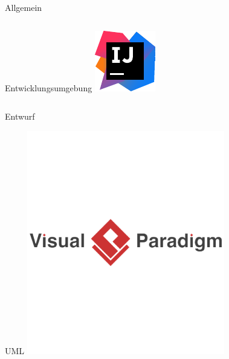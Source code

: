 \documentclass[xcolor=dvipsnames]{beamer}
\begin{document}
\begin{frame}{Allgemein}
\begin{columns}
\begin{column}{0.5\textwidth}
\begin{block}{Entwicklungsumgebung}
                    \includegraphics[width=\textwidth]{img/intellij.pdf}
                \end{block}
            \end{column}
        \end{columns}
    \end{frame}
    \begin{frame}{Entwurf}
        \begin{block}{UML}
            \center
            \includegraphics[width=(\textwidth)]{img/vispar.png} %
        \end{block}
    \end{frame}
\end{document}
